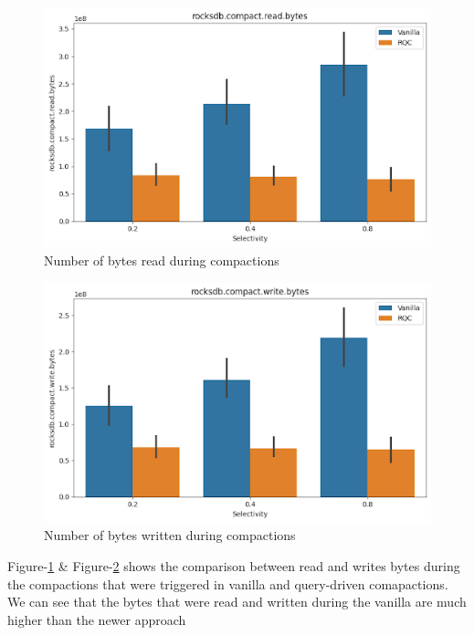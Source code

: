 \begin{figure}
    \includegraphics[scale=0.45]{Figures/Compaction Read Bytes.png}
    \caption{Number of bytes read during compactions}\label{fig:compaction_read_bytes}
\end{figure}

\begin{figure}
    \includegraphics[scale=0.45]{Figures/Compaction Write Bytes.png}
    \caption{Number of bytes written during compactions}\label{fig:compaction_write_bytes}
\end{figure}

Figure-\ref{fig:compaction_read_bytes} \& Figure-\ref{fig:compaction_write_bytes} shows the comparison between read and writes bytes during the compactions that were triggered in vanilla 
and query-driven comapactions. We can see that the bytes that were read and written during the vanilla are much higher 
than the newer approach

